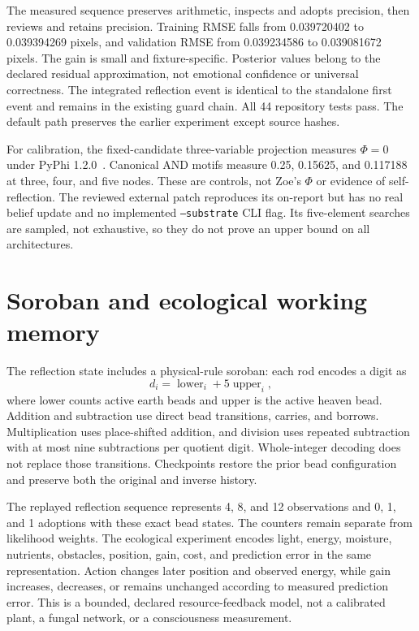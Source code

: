 The measured sequence preserves arithmetic, inspects and adopts precision, then reviews and retains precision. Training RMSE falls from 0.039720402 to 0.039394269 pixels, and validation RMSE from 0.039234586 to 0.039081672 pixels. The gain is small and fixture-specific. Posterior values belong to the declared residual approximation, not emotional confidence or universal correctness. The integrated reflection event is identical to the standalone first event and remains in the existing guard chain. All 44 repository tests pass. The default path preserves the earlier experiment except source hashes.

For calibration, the fixed-candidate three-variable projection measures $\Phi=0$ under PyPhi 1.2.0~\cite{mayner2018pyphi}. Canonical AND motifs measure 0.25, 0.15625, and 0.117188 at three, four, and five nodes. These are controls, not Zoe's $\Phi$ or evidence of self-reflection. The reviewed external patch reproduces its on-report but has no real belief update and no implemented \texttt{--substrate} CLI flag. Its five-element searches are sampled, not exhaustive, so they do not prove an upper bound on all architectures.

\section{Soroban and ecological working memory}
The reflection state includes a physical-rule soroban: each rod encodes a digit as
\begin{equation}
d_i=\operatorname{lower}_i+5\operatorname{upper}_i,
\end{equation}
where lower counts active earth beads and upper is the active heaven bead. Addition and subtraction use direct bead transitions, carries, and borrows. Multiplication uses place-shifted addition, and division uses repeated subtraction with at most nine subtractions per quotient digit. Whole-integer decoding does not replace those transitions. Checkpoints restore the prior bead configuration and preserve both the original and inverse history.

The replayed reflection sequence represents 4, 8, and 12 observations and 0, 1, and 1 adoptions with these exact bead states. The counters remain separate from likelihood weights. The ecological experiment encodes light, energy, moisture, nutrients, obstacles, position, gain, cost, and prediction error in the same representation. Action changes later position and observed energy, while gain increases, decreases, or remains unchanged according to measured prediction error. This is a bounded, declared resource-feedback model, not a calibrated plant, a fungal network, or a consciousness measurement.

